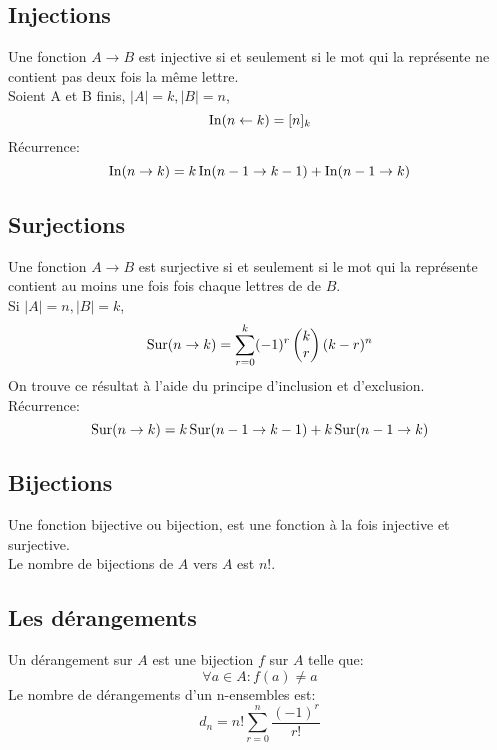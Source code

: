 \subsection{Injections}
Une fonction $A \to B$ est injective si et seulement si le mot qui la représente ne contient pas deux fois la même lettre.\\

Soient A et B finis, $|A| = k, |B| = n$,
\[ \operatorname{In}(n \leftarrow k) = [n]_k \]
Récurrence:
\[ \operatorname{In}(n \to k) = k\operatorname{In}(n-1 \to k-1) + \operatorname{In}(n-1 \to k) \]

\subsection{Surjections}
Une fonction $A \to B$ est surjective si et seulement si le mot qui la représente contient au moins une fois fois chaque lettres de de $B$.\\
Si $|A| = n , |B| = k$,
\[ \operatorname{Sur}(n \rightarrow k) = \sum_{r = 0}^k (-1)^r\begin{pmatrix}  k  \\ r \end{pmatrix} (k - r)^n \]
On trouve ce résultat à l'aide du principe d'inclusion et d'exclusion.\\
Récurrence:
\[ \operatorname{Sur}(n \to k) = k\operatorname{Sur}(n-1 \to k-1) + k\operatorname{Sur}(n-1 \to k) \]

\subsection{Bijections}
Une fonction bijective ou bijection, est une fonction à la fois injective et surjective.\\
Le nombre de bijections de $A$ vers $A$ est $n!$.

\subsection{Les dérangements}
Un dérangement sur $A$ est une bijection $f$ sur $A$ telle que:
\[ \forall a \in A : f(a) \neq a \]
Le nombre de dérangements d'un n-ensembles est:
\[ d_n = n! \sum_{r = 0}^{n} \frac{(-1)^r}{r!} \]

